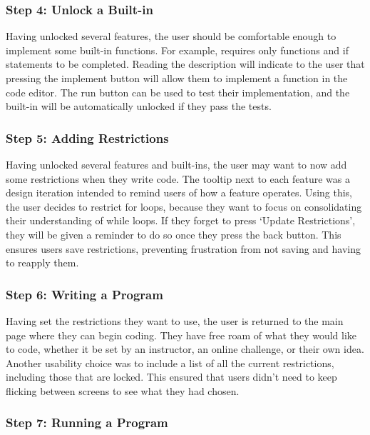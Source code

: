 \subsubsection{Step 4: Unlock a Built-in}

Having unlocked several features, the user should be comfortable enough to implement some built-in functions. For example,  requires only functions and if statements to be completed. Reading the description will indicate to the user that pressing the implement button will allow them to implement a function in the code editor. The run button can be used to test their implementation, and the built-in will be automatically unlocked if they pass the tests.

\subsubsection{Step 5: Adding Restrictions}

Having unlocked several features and built-ins, the user may want to now add some restrictions when they write code. The tooltip next to each feature was a design iteration intended to remind users of how a feature operates. Using this, the user decides to restrict for loops, because they want to focus on consolidating their understanding of while loops. If they forget to press `Update Restrictions', they will be given a reminder to do so once they press the back button. This ensures users save restrictions, preventing frustration from not saving and having to reapply them. 

\subsubsection{Step 6: Writing a Program}

Having set the restrictions they want to use, the user is returned to the main page where they can begin coding. They have free roam of what they would like to code, whether it be set by an instructor, an online challenge, or their own idea. Another usability choice was to include a list of all the current restrictions, including those that are locked. This ensured that users didn't need to keep flicking between screens to see what they had chosen.

\subsubsection{Step 7: Running a Program}

